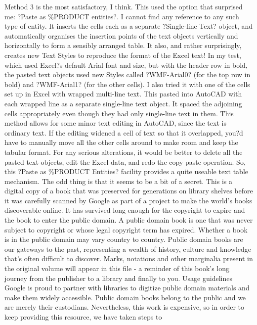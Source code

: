 \documentclass[a4paper]{article}
\begin{document}
{Method 3 is the most satisfactory, I think. This used the option that surprised me: ?Paste as \%PRODUCT entities?. I cannot find any reference to any such type of entity. It inserts the cells each as a separate ?Single-line Text? object, and automatically organises the insertion points of the text objects vertically and horizontally to form a sensibly arranged table. It also, and rather surprisingly, creates new Text Styles to reproduce the format of the Excel text! In my test, which used Excel?s default Arial font and size, but with the header row in bold, the pasted text objects used new Styles called ?WMF-Arial0? (for the top row in bold) and ?WMF-Arial1? (for the other cells).
I also tried it with one of the cells set up in Excel with wrapped multi-line text. This pasted into AutoCAD with each wrapped line as a separate single-line text object. It spaced the adjoining cells appropriately even though they had only single-line text in them.
This method allows for some minor text editing in AutoCAD, since the text is ordinary text. If the editing widened a cell of text so that it overlapped, you?d have to manually move all the other cells around to make room and keep the tabular format. For any serious alterations, it would be better to delete all the pasted text objects, edit the Excel data, and redo the copy-paste operation.
So, this ?Paste as \%PRODUCT Entities? facility provides a quite useable text table mechanism. The odd thing is that it seems to be a bit of a secret.
This is a digital copy of a book that was preserved for generations on library shelves before it was carefully scanned by Google as part of a project 
to make the world's books discoverable online. 
It has survived long enough for the copyright to expire and the book to enter the public domain. A public domain book is one that was never subject 
to copyright or whose legal copyright term has expired. Whether a book is in the public domain may vary country to country. Public domain books 
are our gateways to the past, representing a wealth of history, culture and knowledge that's often difficult to discover. 
Marks, notations and other marginalia present in the original volume will appear in this file - a reminder of this book's long journey from the 
publisher to a library and finally to you. 
Usage guidelines 
Google is proud to partner with libraries to digitize public domain materials and make them widely accessible. Public domain books belong to the 
public and we are merely their custodians. Nevertheless, this work is expensive, so in order to keep providing this resource, we have taken steps to 
}
\end{document}
